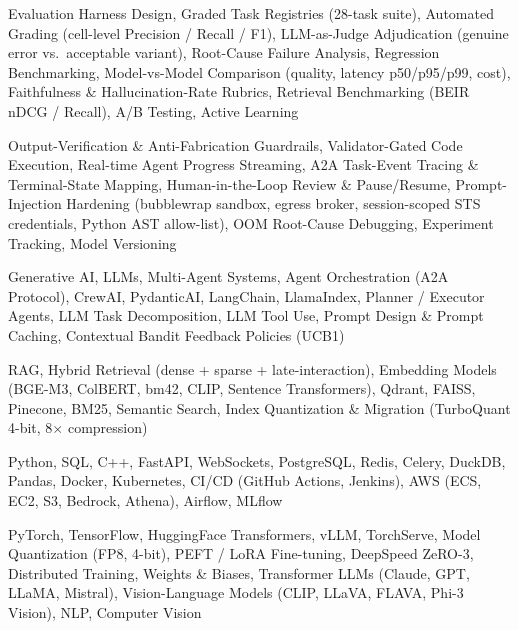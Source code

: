 \documentclass[letter,10pt]{article}
\begin{document}
 Evaluation Harness Design, Graded Task Registries (28-task suite), Automated Grading (cell-level Precision / Recall / F1), LLM-as-Judge Adjudication (genuine error vs.\ acceptable variant), Root-Cause Failure Analysis, Regression Benchmarking, Model-vs-Model Comparison (quality, latency p50/p95/p99, cost), Faithfulness \& Hallucination-Rate Rubrics, Retrieval Benchmarking (BEIR nDCG / Recall), A/B Testing, Active Learning\par\vspace{2pt}

 Output-Verification \& Anti-Fabrication Guardrails, Validator-Gated Code Execution, Real-time Agent Progress Streaming, A2A Task-Event Tracing \& Terminal-State Mapping, Human-in-the-Loop Review \& Pause/Resume, Prompt-Injection Hardening (bubblewrap sandbox, egress broker, session-scoped STS credentials, Python AST allow-list), OOM Root-Cause Debugging, Experiment Tracking, Model Versioning\par\vspace{2pt}

 Generative AI, LLMs, Multi-Agent Systems, Agent Orchestration (A2A Protocol), CrewAI, PydanticAI, LangChain, LlamaIndex, Planner / Executor Agents, LLM Task Decomposition, LLM Tool Use, Prompt Design \& Prompt Caching, Contextual Bandit Feedback Policies (UCB1)\par\vspace{2pt}

 RAG, Hybrid Retrieval (dense + sparse + late-interaction), Embedding Models (BGE-M3, ColBERT, bm42, CLIP, Sentence Transformers), Qdrant, FAISS, Pinecone, BM25, Semantic Search, Index Quantization \& Migration (TurboQuant 4-bit, 8$\times$ compression)\par\vspace{2pt}

 Python, SQL, C++, FastAPI, WebSockets, PostgreSQL, Redis, Celery, DuckDB, Pandas, Docker, Kubernetes, CI/CD (GitHub Actions, Jenkins), AWS (ECS, EC2, S3, Bedrock, Athena), Airflow, MLflow\par\vspace{2pt}

 PyTorch, TensorFlow, HuggingFace Transformers, vLLM, TorchServe, Model Quantization (FP8, 4-bit), PEFT / LoRA Fine-tuning, DeepSpeed ZeRO-3, Distributed Training, Weights \& Biases, Transformer LLMs (Claude, GPT, LLaMA, Mistral), Vision-Language Models (CLIP, LLaVA, FLAVA, Phi-3 Vision), NLP, Computer Vision
\end{document}
